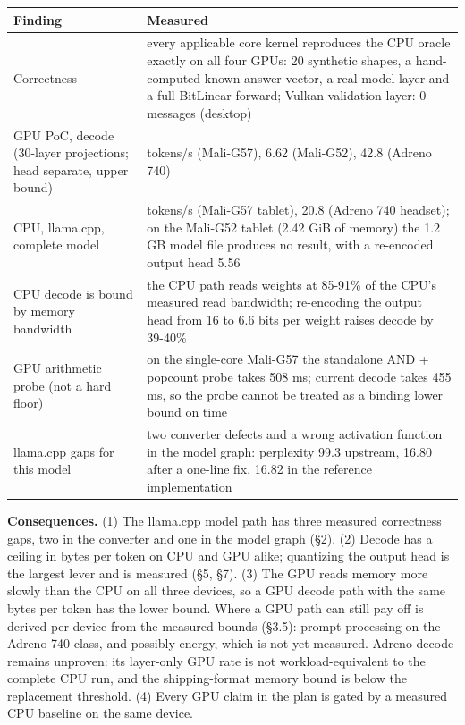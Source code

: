 \documentclass[
  10pt,
]{article}
\newcounter{none} %
\begin{document}
{\def\LTcaptype{none} %
\begin{longtable}[]{@{}
  >{\raggedright\arraybackslash}p{}
  >{\raggedright\arraybackslash}p{}@{}}
\toprule\noalign{}
Finding & Measured \\
\midrule\noalign{}
\endhead%
\bottomrule\noalign{}
\endlastfoot%
Correctness & every applicable core kernel reproduces the CPU oracle
exactly on all four GPUs: 20 synthetic shapes, a hand-computed
known-answer vector, a real model layer and a full BitLinear forward; Vulkan validation layer: 0
messages (desktop) \\
GPU PoC, decode (30-layer projections; head separate, upper bound) & 2.20 tokens/s
(Mali-G57), 6.62 (Mali-G52), 42.8 (Adreno 740) \\
CPU, llama.cpp, complete model & 2.56 tokens/s (Mali-G57 tablet), 20.8
(Adreno 740 headset); on the Mali-G52 tablet (2.42 GiB of memory) the
1.2 GB model file produces no result, with a re-encoded output head
5.56 \\
CPU decode is bound by memory bandwidth & the CPU path reads weights at
85-91\% of the CPU's measured read bandwidth; re-encoding the output
head from 16 to 6.6 bits per weight raises decode by 39-40\% \\
GPU arithmetic probe (not a hard floor) & on the single-core Mali-G57 the
standalone AND + popcount probe takes 508 ms; current decode takes 455 ms,
so the probe cannot be treated as a binding lower bound on time \\
llama.cpp gaps for this model & two converter defects and a wrong
activation function in the model graph: perplexity 99.3 upstream, 16.80
after a one-line fix, 16.82 in the reference implementation \\
\end{longtable}
}

\textbf{Consequences.} (1) The llama.cpp model path has three measured
correctness gaps, two in the converter and one in the model graph (\S{}2). (2) Decode has
a ceiling in bytes per token on CPU and GPU alike; quantizing the output
head is the largest lever and is measured (\S{}5, \S{}7). (3) The GPU
reads memory more slowly than the CPU on all three devices, so a GPU
decode path with the same bytes per token has the lower bound. Where a
GPU path can still pay off is derived per device from the measured
bounds (\S{}3.5): prompt processing on the Adreno 740 class, and possibly
energy, which is not yet measured. Adreno decode remains unproven: its
layer-only GPU rate is not workload-equivalent to the complete CPU run,
and the shipping-format memory bound is below the replacement threshold. (4) Every GPU claim in the
plan is gated by a measured CPU baseline on the same device.
\end{document}
